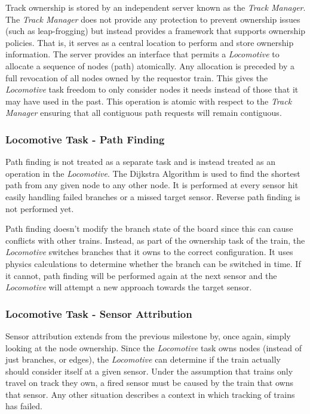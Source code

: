 \documentclass[twoside,a4paper]{refart}
\begin{document}
Track ownership is stored by an independent server known as the \textit{Track Manager}. The \textit{Track Manager} does not provide any protection to prevent ownership issues (such as leap-frogging) but instead provides a framework that supports ownership policies. That is, it serves as a central location to perform and store ownership information. The server provides an interface that permits a \textit{Locomotive} to allocate a sequence of nodes (path) atomically. Any allocation is preceded by a full revocation of all nodes owned by the requestor train. This gives the \textit{Locomotive} task freedom to only consider nodes it needs instead of those that it may have used in the past. This operation is atomic with respect to the \textit{Track Manager} ensuring that all contiguous path requests will remain contiguous.

\subsubsection{Locomotive Task - Path Finding}
Path finding is not treated as a separate task and is instead treated as an operation in the \textit{Locomotive}. The Dijkstra Algorithm is used to find the shortest path from any given node to any other node. It is performed at every sensor hit easily handling failed branches or a missed target sensor. Reverse path finding is not performed yet.

Path finding doesn't modify the branch state of the board since this can cause conflicts with other trains. Instead, as part of the ownership task of the train, the \textit{Locomotive} switches branches that it owns to the correct configuration. It uses physics calculations to determine whether the branch can be switched in time. If it cannot, path finding will be performed again at the next sensor and the \textit{Locomotive} will attempt a new approach towards the target sensor.

\subsubsection{Locomotive Task - Sensor Attribution}
Sensor attribution extends from the previous milestone by, once again, simply looking at the node ownership. Since the \textit{Locomotive} task owns nodes (instead of just branches, or edges), the \textit{Locomotive} can determine if the train actually should consider itself at a given sensor. Under the assumption that trains only travel on track they own, a fired sensor must be caused by the train that owns that sensor. Any other situation describes a context in which tracking of trains has failed.
\end{document}
